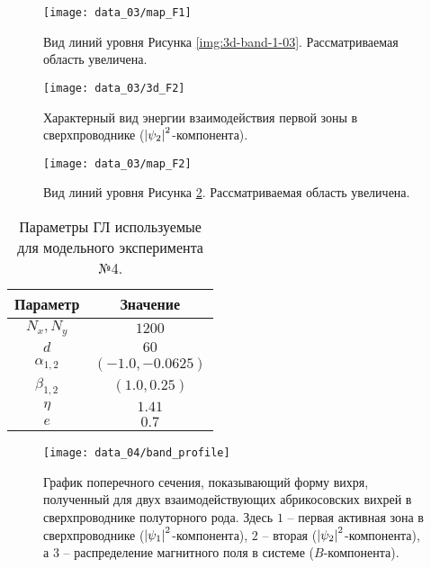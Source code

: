 \begin{figure}[h!]
    \center
    \texttt{[image: data\_03/map\_F1]}
    \caption{Вид линий уровня Рисунка \ref{img:3d-band-1-03}. 
        Рассматриваемая область увеличена.}
    \label{img:map-band-1-03}
\end{figure}

\begin{figure}[h!]
    \center
    \texttt{[image: data\_03/3d\_F2]}
    \caption{Характерный вид энергии взаимодействия первой зоны в 
        сверхпроводнике (\( \left| \psi_2 \right|^2 \)-компонента).}
    \label{img:3d-band-2-03}
\end{figure}

\begin{figure}[h!]
    \center
    \texttt{[image: data\_03/map\_F2]}
    \caption{Вид линий уровня Рисунка \ref{img:3d-band-2-03}. 
        Рассматриваемая область увеличена.}
    \label{img:map-band-2-03}
\end{figure}

\clearpage


\begin{table}[h!]
    \centering
    \begin{tabular}{|c|c|}
        \hline 
        Параметр           & Значение              \\ \hline
        \( N_x, N_y \)     & \( 1200 \)            \\ \hline
        \( d \)            & \( 60 \)              \\ \hline
        \( \alpha_{1,2} \) & \( (-1.0, -0.0625) \) \\ \hline
        \( \beta_{1,2} \)  & \( (1.0, 0.25) \)     \\ \hline
        \( \eta \)         & \( 1.41 \)            \\ \hline
        \( e \)            & \( 0.7 \)             \\ \hline
    \end{tabular}
    \caption{Параметры ГЛ используемые для модельного эксперимента №4.}
    \label{param:04}
\end{table}

\begin{figure}[h!]
    \center
    \texttt{[image: data\_04/band\_profile]}
    \caption{График поперечного сечения, показывающий форму вихря, полученный 
        для двух взаимодействующих абрикосовских вихрей в сверхпроводнике 
        полуторного рода. Здесь \( 1 \) -- первая активная зона в 
        сверхпроводнике (\( \left| \psi_1 \right|^2 \)-компонента), \( 2 \) -- вторая 
        (\( \left| \psi_2 \right|^2 \)-компонента), а \( 3 \) -- распределение 
        магнитного поля в системе (\( B \)-компонента).}
    \label{img:band-profile-04}
\end{figure}

